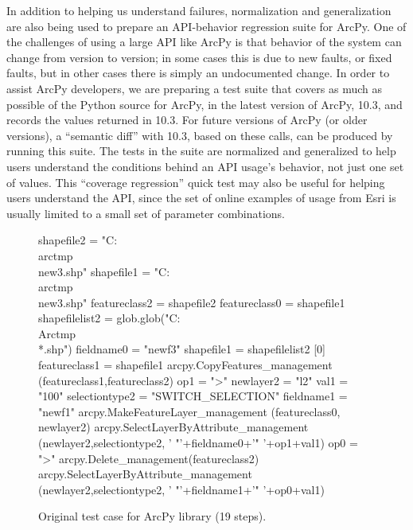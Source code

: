 In addition to helping us understand failures, normalization and
generalization are also being used to prepare an API-behavior
regression suite for ArcPy.  One of the challenges of using a large
API like ArcPy is that behavior of the system can change from version
to version; in some cases this is due to new faults, or fixed faults,
but in other cases there is simply an undocumented change.  In order
to assist ArcPy developers, we are preparing a test suite that covers
as much as possible of the Python source for ArcPy, in the latest version of ArcPy,
10.3, and records the values returned in 10.3.  For future versions of
ArcPy (or older versions), a ``semantic diff'' with 10.3, based on
these calls, can be produced by running this suite.  The tests in the
suite are normalized and generalized to help users understand the
conditions behind an API usage's behavior, not just one set of
values.  This ``coverage regression'' quick test \cite{icst2014} may
also be useful for helping users understand the API, since the set of
online examples of usage from Esri is usually limited to a small set
of parameter combinations.

\begin{figure}
{\scriptsize 
\begin{code}
shapefile2 = "C:\\arctmp\\new3.shp" 
shapefile1 = "C:\\arctmp\\new3.shp" 
featureclass2 = shapefile2 
featureclass0 = shapefile1 
shapefilelist2 = 
   glob.glob("C:\\Arctmp\\*.shp") 
fieldname0 = "newf3" 
shapefile1 = shapefilelist2 [0] 
featureclass1 = shapefile1 
arcpy.CopyFeatures\_management
   (featureclass1,featureclass2) 
op1 = ">" 
newlayer2 = "l2" 
val1 = "100" 
selectiontype2 = "SWITCH\_SELECTION" 
fieldname1 = "newf1" 
arcpy.MakeFeatureLayer\_management
   (featureclass0, newlayer2) 
arcpy.SelectLayerByAttribute\_management
   (newlayer2,selectiontype2,
   ' "'+fieldname0+'" '+op1+val1) 
op0 = ">" 
arcpy.Delete\_management(featureclass2) 
arcpy.SelectLayerByAttribute\_management
   (newlayer2,selectiontype2,
   ' "'+fieldname1+'" '+op0+val1) 
\end{code}
}
\caption{Original test case for ArcPy library (19 steps).}
\label{esriorig}
\end{figure}

